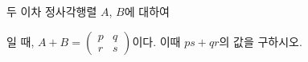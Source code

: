 \hspace*{2mm}\begin{minipage}[t]{\dimexpr\linewidth-2mm\relax}\vspace{0pt}
두 이차 정사각행렬 $A$, $B$에 대하여 \par\smallskip{}\par\smallskip\noindent 일 때, $A+B=\begin{pmatrix} p & q \\ r & s \end{pmatrix}$이다. 이때 $ps+qr$의 값을 구하시오.\end{minipage}
